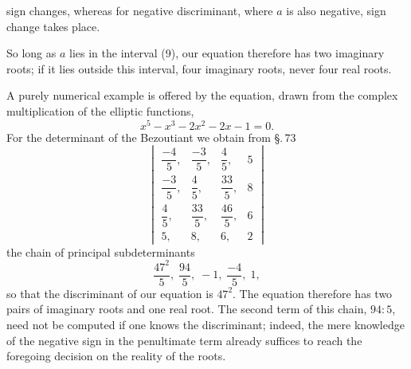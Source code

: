 sign changes, whereas for negative discriminant, where $a$ is also negative,  sign change takes place.

So long as $a$ lies in the interval (9), our equation therefore has two imaginary roots; if it lies outside this interval, four imaginary roots, never four real roots.

A purely numerical example is offered by the equation, drawn from the complex multiplication of the elliptic functions,
\[
x^5 - x^3 - 2x^2 - 2x - 1 = 0.
\]
For the determinant of the Bezoutiant we obtain from \S.\,73
\[
\begin{vmatrix}
\dfrac{-4}{5}, & \dfrac{-3}{5}, & \dfrac{4}{5}, & 5 \\[6pt]
\dfrac{-3}{5}, & \dfrac{4}{5}, & \dfrac{33}{5}, & 8 \\[6pt]
\dfrac{4}{5}, & \dfrac{33}{5}, & \dfrac{46}{5}, & 6 \\[6pt]
5, & 8, & 6, & 2
\end{vmatrix}
\]
the chain of principal subdeterminants
\[
\frac{47^2}{5}, \; \frac{94}{5}, \; -1, \; \frac{-4}{5}, \; 1,
\]
so that the discriminant of our equation is $47^2$. The equation therefore has two pairs of imaginary roots and one real root. The second term of this chain, $94 : 5$, need not be computed if one knows the discriminant; indeed, the mere knowledge of the negative sign in the penultimate term already suffices to reach the foregoing decision on the reality of the roots.
